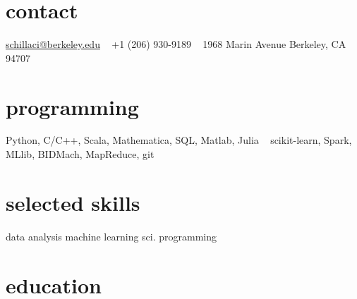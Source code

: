\documentclass[]{friggeri-cv} %
\begin{document}


\begin{aside} %
\section{contact}
\href{mailto:schillaci@berkeley.edu}{schillaci@berkeley.edu}
~
+1 (206) 930-9189
~
1968 Marin Avenue
Berkeley, CA 94707
\section{programming}
Python, C/C++, Scala, Mathematica, SQL, Matlab, Julia
~
scikit-learn, Spark, MLlib, BIDMach, MapReduce, git
\section{selected skills}
data analysis
machine learning
sci. programming
\end{aside}


\section{education}
\end{document}
